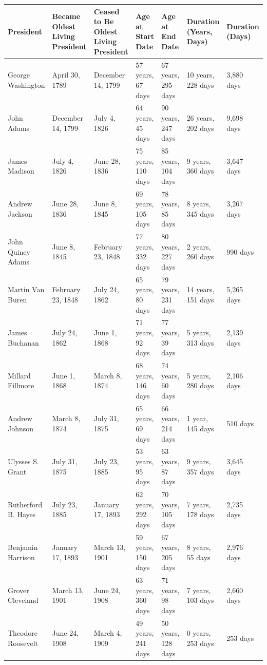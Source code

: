 \documentclass{article}
\begin{document}
\begin{tabular}{lllllll}
\toprule
President & Became Oldest Living President & Ceased to Be Oldest Living President & Age at Start Date & Age at End Date & Duration (Years, Days) & Duration (Days) \\
\midrule
George Washington & April 30, 1789 & December 14, 1799 & 57 years, 67 days & 67 years, 295 days & 10 years, 228 days & 3,880 days \\
John Adams & December 14, 1799 & July 4, 1826 & 64 years, 45 days & 90 years, 247 days & 26 years, 202 days & 9,698 days \\
James Madison & July 4, 1826 & June 28, 1836 & 75 years, 110 days & 85 years, 104 days & 9 years, 360 days & 3,647 days \\
Andrew Jackson & June 28, 1836 & June 8, 1845 & 69 years, 105 days & 78 years, 85 days & 8 years, 345 days & 3,267 days \\
John Quincy Adams & June 8, 1845 & February 23, 1848 & 77 years, 332 days & 80 years, 227 days & 2 years, 260 days & 990 days \\
Martin Van Buren & February 23, 1848 & July 24, 1862 & 65 years, 80 days & 79 years, 231 days & 14 years, 151 days & 5,265 days \\
James Buchanan & July 24, 1862 & June 1, 1868 & 71 years, 92 days & 77 years, 39 days & 5 years, 313 days & 2,139 days \\
Millard Fillmore & June 1, 1868 & March 8, 1874 & 68 years, 146 days & 74 years, 60 days & 5 years, 280 days & 2,106 days \\
Andrew Johnson & March 8, 1874 & July 31, 1875 & 65 years, 69 days & 66 years, 214 days & 1 year, 145 days & 510 days \\
Ulysses S. Grant & July 31, 1875 & July 23, 1885 & 53 years, 95 days & 63 years, 87 days & 9 years, 357 days & 3,645 days \\
Rutherford B. Hayes & July 23, 1885 & January 17, 1893 & 62 years, 292 days & 70 years, 105 days & 7 years, 178 days & 2,735 days \\
Benjamin Harrison & January 17, 1893 & March 13, 1901 & 59 years, 150 days & 67 years, 205 days & 8 years, 55 days & 2,976 days \\
Grover Cleveland & March 13, 1901 & June 24, 1908 & 63 years, 360 days & 71 years, 98 days & 7 years, 103 days & 2,660 days \\
Theodore Roosevelt & June 24, 1908 & March 4, 1909 & 49 years, 241 days & 50 years, 128 days & 0 years, 253 days & 253 days \\

\end{tabular}
\end{document}
